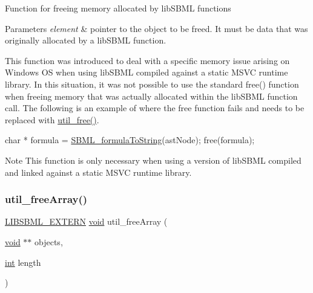 Function for freeing memory allocated by lib\+S\+B\+ML functions


\begin{DoxyParams}{Parameters}
{\em element} & pointer to the object to be freed. It must be data that was originally allocated by a lib\+S\+B\+ML function.\\
\hline
\end{DoxyParams}
This function was introduced to deal with a specific memory issue arising on Windows OS when using lib\+S\+B\+ML compiled against a static M\+S\+VC runtime library. In this situation, it was not possible to use the standard {\ttfamily free()} function when freeing memory that was actually allocated within the lib\+S\+B\+ML function call. The following is an example of where the free function fails and needs to be replaced with \hyperlink{dependencies_2libsbml-5_815_80-vs2017-release-64_2include_2sbml_2util_2util_8h_a68be89de8c3611f4adf0bd1906875606}{util\+\_\+free()}. 
\begin{DoxyCode}
\textcolor{keywordtype}{char} * formula = \hyperlink{_formula_formatter_8h_a33fa76f0ec1fed628d8e46643d58b2f8}{SBML\_formulaToString}(astNode);
free(formula);
\end{DoxyCode}


\begin{DoxyNote}{Note}
This function is only necessary when using a version of lib\+S\+B\+ML compiled and linked against a static M\+S\+VC runtime library. 
\end{DoxyNote}
\mbox{\label{dependencies_2libsbml-5_815_80-vs2017-release-64_2include_2sbml_2util_2util_8h_a322d811aff951aaba39641d1ad148db9}} 
\subsubsection{\texorpdfstring{util\+\_\+free\+Array()}{util\_freeArray()}}
{\footnotesize\ttfamily \hyperlink{extern_8h_a8e9e5118f0c55d410f8bc217f2954dbf}{L\+I\+B\+S\+B\+M\+L\+\_\+\+E\+X\+T\+E\+RN} \hyperlink{lp__lib_8h_ac7828c7b2b31d2e11af17bdb6289c5d9}{void} util\+\_\+free\+Array (\begin{DoxyParamCaption}\item[{\hyperlink{lp__lib_8h_ac7828c7b2b31d2e11af17bdb6289c5d9}{void} $\ast$$\ast$}]{objects,  }\item[{\hyperlink{lp__lib_8h_adeb9ec6400320e4923ac9d836d509ddb}{int}}]{length }\end{DoxyParamCaption})}


